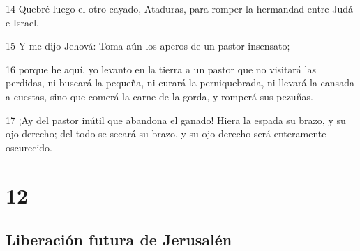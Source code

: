 \par 14 Quebré luego el otro cayado, Ataduras, para romper la hermandad entre Judá e Israel.
\par 15 Y me dijo Jehová: Toma aún los aperos de un pastor insensato;
\par 16 porque he aquí, yo levanto en la tierra a un pastor que no visitará las perdidas, ni buscará la pequeña, ni curará la perniquebrada, ni llevará la cansada a cuestas, sino que comerá la carne de la gorda, y romperá sus pezuñas.
\par 17 ¡Ay del pastor inútil que abandona el ganado! Hiera la espada su brazo, y su ojo derecho; del todo se secará su brazo, y su ojo derecho será enteramente oscurecido.

\chapter{12}

\section*{Liberación futura de Jerusalén}

